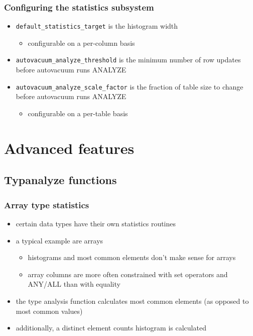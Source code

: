 \documentclass{beamer}
\begin{document}
\begin{frame}
  \frametitle{Configuring the statistics subsystem}

  \begin{itemize}
  \item \texttt{default\_statistics\_target} is the \alert{histogram width}
    \begin{itemize}
    \item configurable on a per-column basis
    \end{itemize}
  \item \texttt{autovacuum\_analyze\_threshold} is the minimum \alert{number of
    row updates} before autovacuum runs ANALYZE
  \item \texttt{autovacuum\_analyze\_scale\_factor} is the \alert{fraction of
    table size} to change before autovacuum runs ANALYZE
    \begin{itemize}
    \item configurable on a per-table basis
    \end{itemize}
  \end{itemize}
\end{frame}

\section{Advanced features}
\subsection{Typanalyze functions}

\begin{frame}
  \frametitle{Array type statistics}

  \begin{itemize}
  \item certain \alert{data types} have their own statistics routines
  \item a typical example are \alert{arrays}
    \begin{itemize}
    \item histograms and most common elements \alert{don't make sense} for
      arrays
    \item array columns are more often constrained with \alert{set operators}
      and \alert{ANY/ALL} than with equality
    \end{itemize}
  \item the type analysis function calculates \alert{most common elements} (as
    opposed to \alert{most common values})
  \item additionally, a \alert{distinct element counts histogram} is calculated
  \end{itemize}
\end{frame}
\end{document}
